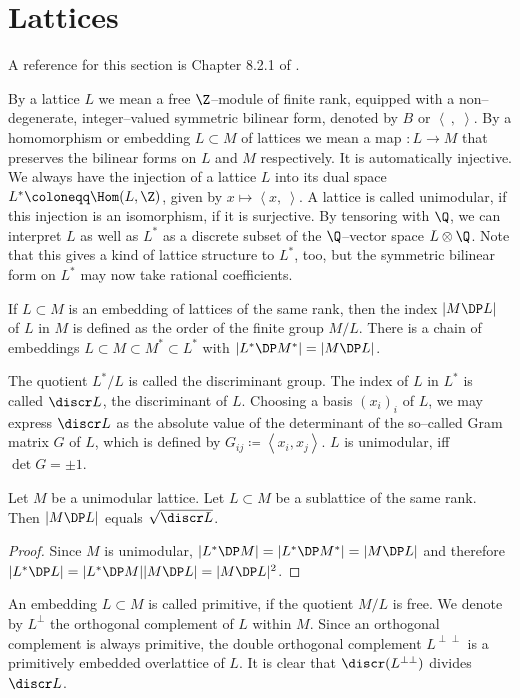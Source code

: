 
\section{Lattices}\label{latticeSubsection}A reference for this section is Chapter 8.2.1 of \cite{Dolgachev}. 
\begin{definition}
By a lattice $L$ we mean a free $\Z$--module of finite rank, equipped with a non--degenerate, integer--valued symmetric bilinear form, denoted by $B$ or $\left<\ ,\;\right>$. 
By a homomorphism or embedding $L\subset M$ of lattices we mean a map $:L\rightarrow M$ that preserves the bilinear forms on $L$ and $M$ respectively. It is automatically injective. We always have the injection of a lattice $L$ into its dual space $L^*\coloneqq \Hom(L,\Z)$, given by $x \mapsto \left<x,\ \right>$. A lattice is called unimodular, if this injection is an isomorphism, \ie if it is surjective. By tensoring with $\Q$, we can interpret $L$ as well as $L^*$ as a discrete subset of the $\Q$--vector space $L\otimes \Q$. Note that this gives a kind of lattice structure to $L^*$, too, but the symmetric bilinear form on $L^*$ may now take rational coefficients.


If $L\subset M$ is an embedding of lattices of the same rank, then the index $|M\DP L|$ of $L$ in $M$ is defined as the order of the finite group $M/L$.
There is a chain of embeddings $L\subset M \subset M^* \subset L^*$ with $|L^*\DP M^*| =|M\DP L| $.

The quotient $L^*/L$ is called the discriminant group. The index of $L$ in $L^*$ is called $\discr L$, the discriminant of $L$.
Choosing a basis $(x_i)_i$ of $L$, we may express $\discr L$ as the absolute value of the determinant of the so--called Gram matrix $G$ of $L$, which is defined by $G_{ij}\coloneqq \left<x_i,x_j\right>$. $L$ is unimodular, iff $\det G =\pm 1$.
\end{definition}
\begin{proposition} \label{squareDiscr}Let $M$ be a unimodular lattice. Let $L\subset M$ be a sublattice of the same rank. Then $|M\DP L|$ equals $\sqrt{\discr L}$.
\end{proposition}
\begin{proof}
Since $M$ is unimodular, $|L^*\DP M|=|L^*\DP M^*| =|M\DP L| $ and therefore $|L^*\DP L| = |L^*\DP M||M\DP L|  = |M\DP L|^2$.
\end{proof}
An embedding $L\subset M$ is called primitive, if the quotient $M/L$ is free. We denote by $L^\perp$ the orthogonal complement of $L$ within $M$. Since an orthogonal complement is always primitive, the double orthogonal complement $ L^{\perp\perp}$ is a primitively embedded overlattice of $L$. It is clear that $\discr( L^{\perp\perp})$ divides $\discr L$. 
